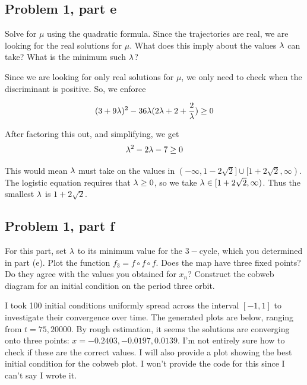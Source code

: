 \subsection{Problem 1, part e}
Solve for $\mu$ using the quadratic formula. Since the trajectories are real, we are looking for the real solutions for $\mu$. What does this imply about the values $\lambda$ can take? What is the minimum such $\lambda$?
\partbreak
\begin{solution}

    Since we are looking for only real solutions for $\mu$, we only need to check when the discriminant is positive. So, we enforce 

    \[
    (3 + 9\lambda)^2 - 36\lambda(2\lambda + 2 + \frac{2}{\lambda}) \geq 0
    \]

    After factoring this out, and simplifying, we get
    \[
    \lambda^2 - 2\lambda - 7 \geq 0
    \]

    This would mean $\lambda $ must take on the values in $(-\infty, 1 - 2\sqrt{2}] \cup [1 + 2\sqrt{2} , \infty)$. The logistic equation requires that $\lambda \geq 0$, so we take $\lambda \in [1 + 2\sqrt{2} , \infty)$. Thus the smallest $\lambda$ is $1 + 2 \sqrt{2}$.
\end{solution}
\newpage
\subsection{Problem 1, part f}
For this part, set $\lambda$ to its minimum value for the $3-$cycle, which you determined in part (e). Plot the function $f_3 = f \circ f \circ f$. Does the map have three fixed points? Do they agree with the values you obtained for $x_n$? Construct the cobweb diagram for an initial condition on the period three orbit. 
\partbreak
\begin{solution}

    I took 100 initial conditions uniformly spread across the interval $[-1, 1]$ to investigate their convergence over time. The generated plots are below, ranging from $t = 75, 20000$. By rough estimation, it seems the solutions are converging onto three points: $x = -0.2403, -0.0197, 0.0139$. I'm not entirely sure how to check if these are the correct values. I will also provide a plot showing the best initial condition for the cobweb plot. I won't provide the code for this since I can't say I wrote it. 
\end{solution}

